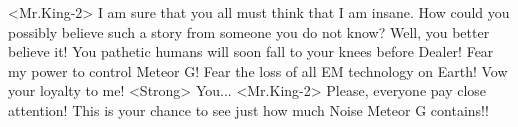 <Mr.King-2> I am sure that you all must think that I am insane. 
How could you possibly believe such a story from someone you do not know? 
Well, you better believe it! 
You pathetic humans will soon fall to your knees before Dealer! 
Fear my power to control Meteor G! Fear the loss of all EM technology on Earth! 
Vow your loyalty to me! 
<Strong> You... 
<Mr.King-2> Please, everyone pay close attention! 
This is your chance to see just how much Noise Meteor G contains!! 
